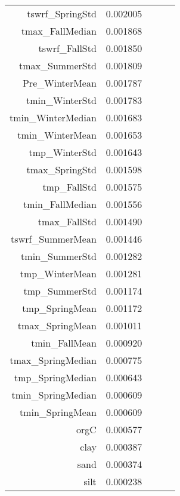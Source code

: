 \begin{tabular}{rrrrr}
tswrf_SpringStd & 0.002005 \\
tmax_FallMedian & 0.001868 \\
tswrf_FallStd & 0.001850 \\
tmax_SummerStd & 0.001809 \\
Pre_WinterMean & 0.001787 \\
tmin_WinterStd & 0.001783 \\
tmin_WinterMedian & 0.001683 \\
tmin_WinterMean & 0.001653 \\
tmp_WinterStd & 0.001643 \\
tmax_SpringStd & 0.001598 \\
tmp_FallStd & 0.001575 \\
tmin_FallMedian & 0.001556 \\
tmax_FallStd & 0.001490 \\
tswrf_SummerMean & 0.001446 \\
tmin_SummerStd & 0.001282 \\
tmp_WinterMean & 0.001281 \\
tmp_SummerStd & 0.001174 \\
tmp_SpringMean & 0.001172 \\
tmax_SpringMean & 0.001011 \\
tmin_FallMean & 0.000920 \\
tmax_SpringMedian & 0.000775 \\
tmp_SpringMedian & 0.000643 \\
tmin_SpringMedian & 0.000609 \\
tmin_SpringMean & 0.000609 \\
orgC & 0.000577 \\
clay & 0.000387 \\
sand & 0.000374 \\
silt & 0.000238 \\
\bottomrule
\end{tabular}
